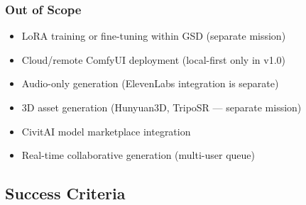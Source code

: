 \documentclass[11pt,letterpaper]{article}
\begin{document}
\subsubsection{Out of Scope}
\begin{itemize}[leftmargin=1.5em]
  \item LoRA training or fine-tuning within GSD (separate mission)
  \item Cloud/remote ComfyUI deployment (local-first only in v1.0)
  \item Audio-only generation (ElevenLabs integration is separate)
  \item 3D asset generation (Hunyuan3D, TripoSR --- separate mission)
  \item CivitAI model marketplace integration
  \item Real-time collaborative generation (multi-user queue)
\end{itemize}

\subsection{Success Criteria}
\end{document}
